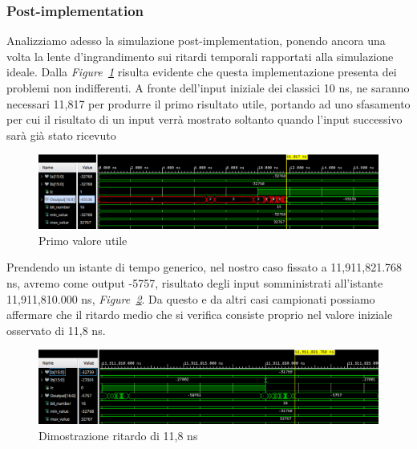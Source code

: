 \subsubsection{Post-implementation}
Analizziamo adesso la simulazione post-implementation, ponendo ancora una volta la lente d'ingrandimento sui ritardi temporali rapportati alla simulazione ideale.
Dalla \textit{Figure~\ref{16bit_pi_x}} risulta evidente che questa implementazione presenta dei problemi non indifferenti. A fronte dell'input iniziale dei classici 10 ns, ne saranno necessari 11,817 per
produrre il primo risultato utile, portando ad uno sfasamento per cui il risultato di un input verrà mostrato soltanto quando l'input successivo sarà già stato ricevuto
\begin{figure}[ht]
  \centering
  \includegraphics[width=1\textwidth]{assets/simulations/Post_Implementation/16bit/end_x.png}
  \caption{Primo valore utile}
  \label{16bit_pi_x} 
\end{figure}

Prendendo un istante di tempo generico, nel nostro caso fissato a 11,911,821.768 ns, avremo come output -5757, risultato degli input somministrati all'istante 11,911,810.000 ns, \textit{Figure~\ref{random_val16}}.
Da questo e da altri casi campionati possiamo affermare che il ritardo medio che si verifica consiste proprio nel valore iniziale osservato di 11,8 ns.
\begin{figure}[ht]
  \centering
  \includegraphics[width=1\textwidth]{assets/simulations/Post_Implementation/16bit/random_val.png}
  \caption{Dimostrazione ritardo di 11,8 ns}
  \label{random_val16} 
\end{figure}

